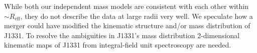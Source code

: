 \documentclass[useAMS,usenatbib]{mnras}
\begin{document}
While both our independent mass models are consistent with each other within $\sim R_\text{eff}$, they do not describe the data at large radii very well. We speculate how a merger could have modified the kinematic structure and/or mass distribution of J1331. To resolve the ambiguities in J1331's mass distribution 2-dimensional kinematic maps of J1331 from integral-field unit spectroscopy are needed.




\label{lastpage}
\end{document}

